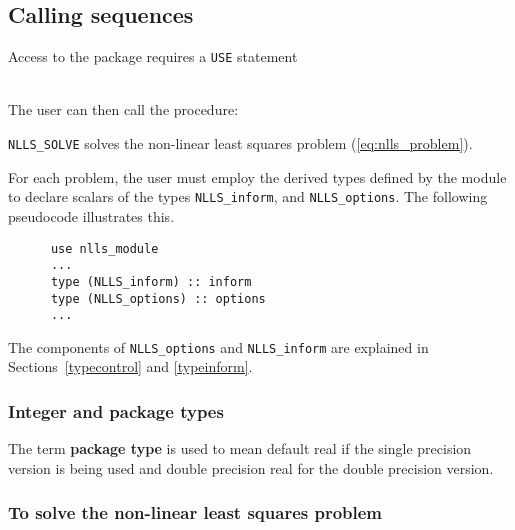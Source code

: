\documentclass{spec}
\begin{document}
\newpage
\hslhowto

\subsection{Calling sequences}

Access to the package requires a {\tt USE} statement \\ \\
\indent\hspace{5mm}{\tt use nlls\_module} 
\medskip

\noindent The user can then call the procedure:
\vspace{-0.1cm}
\begin{description}
\item {\tt NLLS\_SOLVE}  solves the non-linear least squares problem (\ref{eq:nlls_problem}).
\end{description}


\hsltypes
\label{derived types}
For each problem, the user must employ the derived types defined by the
module to declare scalars of the types {\tt NLLS\_inform}, and
{\tt NLLS\_options}.
The following pseudocode illustrates this.
\begin{verbatim}
      use nlls_module
      ...
      type (NLLS_inform) :: inform
      type (NLLS_options) :: options
      ...
\end{verbatim}
The components of {\tt NLLS\_options} and {\tt NLLS\_inform} are explained
in Sections~\ref{typecontrol} and \ref{typeinform}. 


\hslarguments

\subsubsection{Integer and package types}
The term {\bf package type} is used to mean
default real if the single precision version is being used and
double precision real for the double precision version.

\subsubsection{To solve the non-linear least squares problem}
\label{sec:factorize}
\end{document}
